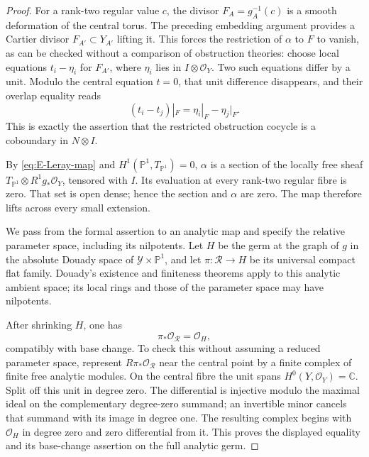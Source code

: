 \begin{proof}
For a rank-two regular value $c$, the divisor
$F_A=g_A^{-1}(c)$ is a smooth deformation of the central torus.
The preceding embedding argument provides a Cartier divisor
$F_{A'}\subset Y_{A'}$ lifting it. This forces the restriction
of $\alpha$ to $F$ to vanish, as can be checked without a comparison
of obstruction theories: choose local equations $t_i-\eta_i$ for
$F_{A'}$, where $\eta_i$ lies in $I\otimes\mathcal O_Y$.
Two such equations differ by a unit. Modulo the central equation
$t=0$, that unit difference disappears, and their overlap equality
reads
\[
 (t_i-t_j)|_F=\eta_i|_F-\eta_j|_F.
\]
This is exactly the assertion that the restricted obstruction
cocycle is a coboundary in $N\otimes I$.

By \eqref{eq:E-Leray-map} and $H^1(\mathbb P^1,T_{\mathbb P^1})=0$,
$\alpha$ is a section of the locally free sheaf
$T_{\mathbb P^1}\otimes R^1g_*\mathcal O_Y$, tensored with $I$.
Its evaluation at every rank-two regular fibre is zero. That set
is open dense; hence the section and $\alpha$ are zero. The map
therefore lifts across every small extension.

We pass from the formal assertion to an analytic map and
specify the relative parameter space, including its nilpotents.
Let $H$ be the germ at the graph of $g$ in the absolute Douady
space of $\mathcal Y\times\mathbb P^1$, and let
$\pi:\mathcal R\to H$ be its universal compact flat family.
Douady's existence and finiteness theorems
\cite[Section~9, Theorems~1--2, pp.~83--85]{Douady1966}
apply to this analytic ambient space; its local rings and those
of the parameter space may have nilpotents.

After shrinking $H$, one has
\[
 \pi_*\mathcal O_{\mathcal R}=\mathcal O_H,
\]
compatibly with base change. To check this without assuming a
reduced parameter space, represent $R\pi_*\mathcal O_{\mathcal R}$
near the central point by a finite complex of finite free analytic
modules. On the central fibre the unit spans
$H^0(Y,\mathcal O_Y)=\mathbb C$. Split off this unit in degree
zero. The differential is injective modulo the maximal ideal on
the complementary degree-zero summand; an invertible minor
cancels that summand with its image in degree one. The resulting
complex begins with $\mathcal O_H$ in degree zero and zero
differential from it. This proves the displayed equality and its
base-change assertion on the full analytic germ.


\end{proof}
